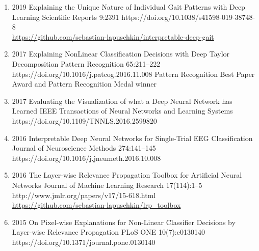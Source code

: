 {\begin{enumerate}
    \item {}
                        {2019}
                        {Explaining the Unique Nature of Individual Gait Patterns with Deep Learning}
                        {Scientific Reports}
                        {9:2391}
                        {https://doi.org/10.1038/s41598-019-38748-8}
                        {\\\href{https://github.com/sebastian-lapuschkin/interpretable-deep-gait}{https://github.com/sebastian-lapuschkin/interpretable-deep-gait}}

    \item {}
                            {2017}
                            {Explaining NonLinear Classification Decisions with Deep Taylor Decomposition}
                            {Pattern Recognition}
                            {65:211--222}
                            {https://doi.org/10.1016/j.patcog.2016.11.008}
                            {Pattern Recognition Best Paper Award and Pattern Recognition Medal winner}

    \item {}
                        {2017}
                        {Evaluating the Visualization of what a Deep Neural Network has Learned}
                        {IEEE Transactions of Neural Networks and Learning Systems}
                        {}
                        {https://doi.org/10.1109/TNNLS.2016.2599820}

    \item {}
                        {2016}
                        {Interpretable Deep Neural Networks for Single-Trial EEG Classification}
                        {Journal of Neuroscience Methods}
                        {274:141--145}
                        {https://doi.org/10.1016/j.jneumeth.2016.10.008}

    \item {}
                        {2016}
                        {The Layer-wise Relevance Propagation Toolbox for Artificial Neural Networks}
                        {Journal of Machine Learning Research}
                        {17(114):1--5}
                        {http://www.jmlr.org/papers/v17/15-618.html}
                        {\\\href{https://github.com/sebastian-lapuschkin/lrp_toolbox}{https://github.com/sebastian-lapuschkin/lrp\_toolbox}}

    \item {}
                        {2015}
                        {On Pixel-wise Explanations for Non-Linear Classifier Decisions by Layer-wise Relevance Propagation}
                        {PLoS ONE}
                        {10(7):e0130140}
                        {https://doi.org/10.1371/journal.pone.0130140}
\end{enumerate}
}